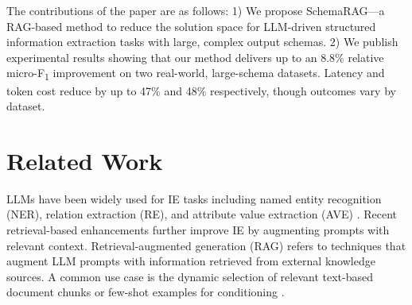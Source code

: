\documentclass[11pt]{article}
\begin{document}
The contributions of the paper are as follows:
1) We propose SchemaRAG---a RAG-based method to reduce the solution space for LLM-driven structured information extraction tasks with large, complex output schemas.
2) We publish experimental results showing that our method delivers  up to an 8.8\% relative micro-F\textsubscript{1} improvement on two real-world, large-schema datasets. Latency and token cost reduce by up to 47\% and 48\% respectively, though outcomes vary by dataset.


\section{Related Work}

LLMs have been widely used for IE tasks including named entity recognition (NER), relation extraction (RE), and attribute value extraction (AVE) \cite{Dagdelen2024, wang2023instructuiemultitaskinstructiontuning, wei2024chatiezeroshotinformationextraction, brinkmann2024, ZOU2025144572,wu-etal-2024-learning}. 
Recent retrieval-based enhancements further improve IE by augmenting prompts with relevant context. 
Retrieval-augmented generation (RAG) \cite{lewis2021retrievalaugmentedgenerationknowledgeintensivenlp} refers to techniques that augment LLM prompts with information retrieved from external knowledge sources. A common use case is the dynamic selection of relevant text-based document chunks or few-shot examples for conditioning \cite{
ma2025knowledgegraphbasedretrievalaugmentedgeneration, 10.1007/978-3-031-72344-5_17}.
\end{document}
